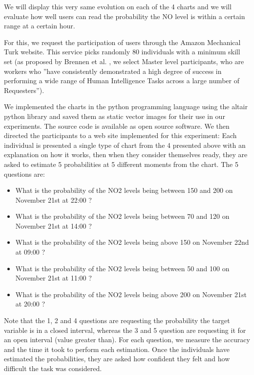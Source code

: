 \documentclass[a4paper,3p,sort&compress]{elsarticle}
\begin{document}
We will display this very same evolution on each of the 4 charts and we will evaluate how well users can 
read the probability the NO level is within a certain range at a certain hour. 

For this, we request the participation of users through the Amazon Mechanical Turk website. 
This service picks randomly 80 individuals with a minimum skill set (as proposed by Brennen 
et al. \cite{brennen_instrument_2018}, we select Master level participants, who are workers who 
''have consistently demonstrated a high degree of success in performing a wide range of Human Intelligence Tasks across a 
large number of Requesters'').

We implemented the charts in the python programming language using the altair python library 
\cite{vanderplas2018altair} and saved them as static vector images for their use in our experiments. The source code is 
available as open source software. We then directed the participants to a web site implemented for this experiment: 
Each individual is presented a 
single type of chart from the 4 presented above with an explanation on how it works, 
then when they consider themselves ready, they are asked to estimate 5 probabilities at 5 different moments from the chart. 
The 5 questions are:
\begin{itemize}
  \item What is the probability of the NO2 levels being between 150 and 200 on November 21st at 22:00 ?
  \item What is the probability of the NO2 levels being between 70 and 120 on November 21st at 14:00 ?
  \item What is the probability of the NO2 levels being above 150 on November 22nd at 09:00 ?
  \item What is the probability of the NO2 levels being between 50 and 100 on November 21st at 11:00 ?
  \item What is the probability of the NO2 levels being above 200 on November 21st at 20:00 ?
\end{itemize}

Note that the 1, 2 and 4 questions are requesting the probability the target variable is in a closed interval, whereas
the 3 and 5 question are requesting it for an open interval (value greater than). 
For each question, we measure the accuracy and the time it took to 
perform each estimation. Once the individuals have estimated the probabilities, they are asked how confident they 
felt and how difficult the task was considered.
\end{document}
